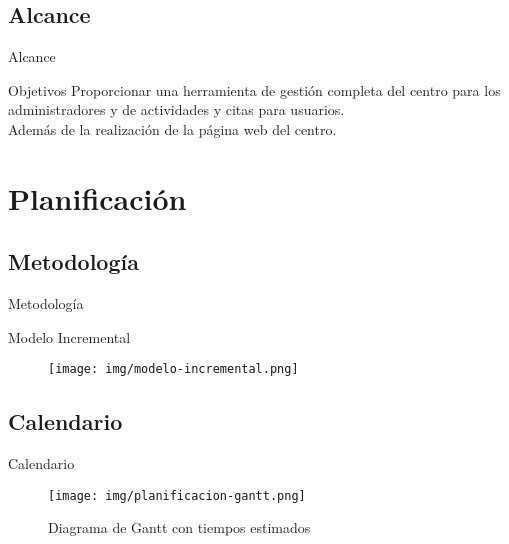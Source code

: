 \documentclass[spanish,xcolor=table,svgnames]{beamer}
\begin{document}
\subsection*{Alcance}
\begin{frame}{Alcance}
\begin{block}{Objetivos}
Proporcionar una herramienta de gestión completa del centro para los administradores y de actividades y citas para usuarios. \\
Además de la realización de la página web del centro.
\end{block}
\end{frame}



\section{Planificación}

\subsection*{Metodologí­a}
\begin{frame}{Metodologí­a}
    \begin{center}
    Modelo Incremental
    \begin{figure}[H]
      \begin{center}
          \texttt{[image: img/modelo-incremental.png]}
      \end{center}
      \label{fig:modelo-incremental}
    \end{figure}
  \end{center}
\end{frame}

\subsection*{Calendario}
\begin{frame}{Calendario}
  \begin{center}
    \begin{figure}[H]
      \begin{center}
          \texttt{[image: img/planificacion-gantt.png]}
      \end{center}
      \caption{Diagrama de Gantt con tiempos estimados}
      \label{fig:gantt}
    \end{figure}
  \end{center}
\end{frame}
\end{document}
